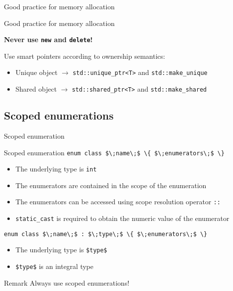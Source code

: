 \begin{frame}{Good practice for memory allocation}{}
  \begin{block}{Good practice for memory allocation}
    \begin{center}
      \Large
      \bfseries
      Never use \lstinline!new! and \lstinline!delete!!
    \end{center}

    Use smart pointers according to ownership semantics:
    \begin{itemize}
    \item
      Unique object $\to$ \lstinline!std::unique_ptr<T>! and \lstinline!std::make_unique!
    \item
      Shared object $\to$ \lstinline!std::shared_ptr<T>! and \lstinline!std::make_shared!
    \end{itemize}
  \end{block}

  \begin{example}
  \end{example}
\end{frame}




\subsection{Scoped enumerations}

\begin{frame}{Scoped enumeration}{}
  \begin{block}{Scoped enumeration}
    {
      \hfill\lstinline[mathescape]!enum class $\;name\;$ \{ $\;enumerators\;$ \}!\hfill
    }

    \begin{itemize}
    \item
      The underlying type is \lstinline!int!
    \item
      The enumerators are contained in the scope of the enumeration
    \item
      The enumerators can be accessed using scope resolution operator \lstinline!::!
    \item
      \lstinline!static_cast! is required to obtain the numeric value of the enumerator
    \end{itemize}

    {
      \hfill\lstinline[mathescape]!enum class $\;name\;$ : $\;type\;$ \{ $\;enumerators\;$ \}!\hfill
    }

    \begin{itemize}
    \item
      The underlying type is \lstinline[mathescape]!$type$!
    \item
      \lstinline[mathescape]!$type$! is an integral type
    \end{itemize}
  \end{block}

  \begin{block}{Remark}
    Always use scoped enumerations!
  \end{block}
\end{frame}

